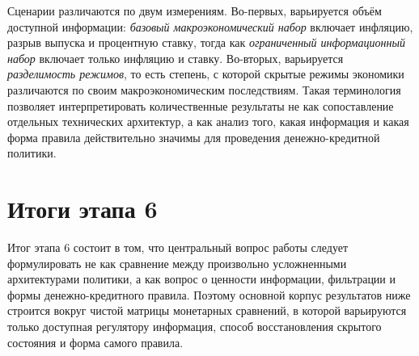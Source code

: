 \documentclass[12pt,a4paper]{article}
\begin{document}
Сценарии различаются по двум измерениям. Во-первых, варьируется объём доступной информации: \textit{базовый макроэкономический набор} включает инфляцию, разрыв выпуска и процентную ставку, тогда как \textit{ограниченный информационный набор} включает только инфляцию и ставку. Во-вторых, варьируется \textit{разделимость режимов}, то есть степень, с которой скрытые режимы экономики различаются по своим макроэкономическим последствиям. Такая терминология позволяет интерпретировать количественные результаты не как сопоставление отдельных технических архитектур, а как анализ того, какая информация и какая форма правила действительно значимы для проведения денежно-кредитной политики.

\section{Итоги этапа 6}

Итог этапа 6 состоит в том, что центральный вопрос работы следует формулировать не как сравнение между произвольно усложненными архитектурами политики, а как вопрос о ценности информации, фильтрации и формы денежно-кредитного правила. Поэтому основной корпус результатов ниже строится вокруг чистой матрицы монетарных сравнений, в которой варьируются только доступная регулятору информация, способ восстановления скрытого состояния и форма самого правила.


\end{document}
